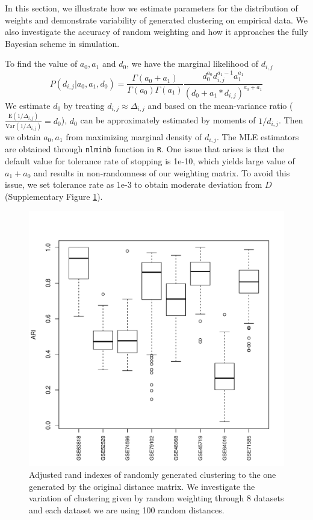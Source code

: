 \documentclass[aoas,preprint]{imsart}
\begin{document}
In this section, we illustrate how we estimate parameters for the distribution of weights and demonstrate variability of generated clustering on empirical data. 
We also investigate the accuracy of random weighting and how it approaches the fully Bayesian scheme in simulation.

To find the value of $a_0, a_1$ and $d_0$, we have the marginal likelihood of $d_{i,j}$ 
$$P(d_{i,j} | a_0, a_1, d_0) = \frac{\Gamma(a_0 + a_1)}{\Gamma(a_0)\Gamma(a_1)} \frac{d_0^{a_0} d_{i,j}^{a_1 - 1}a_1^{a_1}}{(d_0 + a_1 * d_{i,j})^{a_0 + a_1}}$$  
We estimate $d_0$ by treating $d_{i,j} \approx \Delta_{i,j}$ and based on the mean-variance ratio ($\frac{\text{E}(1/\Delta_{i,j})}{\text{Var}(1/\Delta_{i,j})} = d_0$), $d_0$ can be approximately estimated by moments of $1 / d_{i,j}$.
Then we obtain $a_0, a_1$ from maximizing marginal density of $d_{i,j}$. 
The MLE estimators are obtained through \verb+nlminb+ function in \verb+R+. One issue that arises is that the default value for tolerance rate of stopping is 1e-10, which yields large value of $a_1 + a_0$ and results in non-randomness of our weighting matrix. To avoid this issue, we set tolerance rate as 1e-3 to obtain moderate deviation from $D$ (Supplementary Figure \ref{fig:ARI}).
 
\begin{figure}[h!]
\includegraphics[scale = 0.7]{Figs/ARI.pdf}
 \caption{
 Adjusted rand indexes of randomly generated clustering to the one generated by the original distance matrix. 
 We investigate the variation of clustering given by random weighting through 8 datasets 
 and each dataset we are using 100 random distances.
}
  \label{fig:ARI}
\end{figure}
\end{document}
